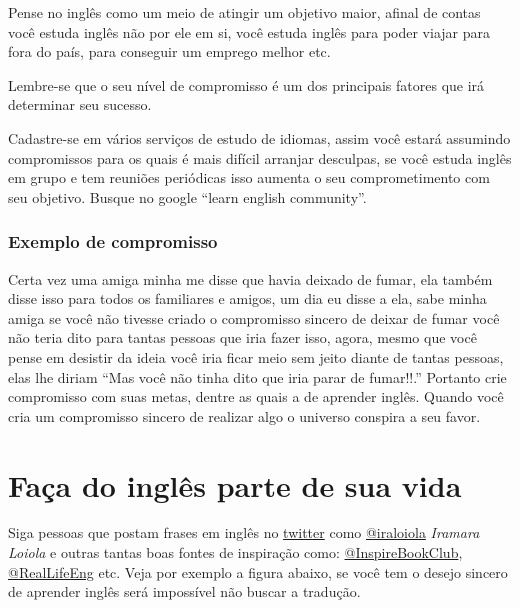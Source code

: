 \noindent
Pense no inglês como um meio de atingir um objetivo maior, afinal de
contas você estuda inglês não por ele em si, você estuda inglês para
poder viajar para fora do país, para conseguir um emprego melhor etc.


\vspace{0.3\baselineskip}
\noindent
{\footnotesize {} Lembre-se que o seu nível de compromisso é um dos principais
fatores que irá determinar seu sucesso.}

\vspace{0.3\baselineskip}
\noindent
{\footnotesize {} Cadastre-se em vários serviços de estudo de idiomas, assim você estará assumindo compromissos
para os quais é mais difícil arranjar desculpas, se você estuda inglês em grupo e tem reuniões periódicas isso
aumenta o seu comprometimento com seu objetivo. Busque no google ``learn english community''.}

\subsubsection{Exemplo de compromisso}

Certa vez uma amiga minha me disse que havia deixado de fumar, ela também
disse isso para todos os familiares e amigos, um dia eu disse a ela, sabe minha amiga
se você não tivesse criado o compromisso sincero de deixar de fumar você não teria
dito para tantas pessoas que iria fazer isso, agora, mesmo que você pense em
desistir da ideia você iria ficar meio sem jeito diante de tantas pessoas, elas
lhe diriam ``Mas você não tinha dito que iria parar de fumar!!.'' Portanto crie
compromisso com suas metas, dentre as quais a de aprender inglês. Quando você
cria um compromisso sincero de realizar algo o universo conspira a seu favor.

\section{Faça do inglês parte de sua vida}\label{sec:EnglishLife}

Siga pessoas que postam frases em inglês no \href{http://www.twitter.com}{twitter} como
 \href{http://www.twitter.com/iraloiola}{@iraloiola} \emph{Iramara Loiola} e outras tantas boas fontes
 de inspiração como: \href{http://www.twitter.com/InspireBookClub}{@InspireBookClub},
\href{http://www.twitter.com/RealLifeEng}{@RealLifeEng} etc. Veja por
exemplo a figura abaixo, se você tem o desejo sincero de aprender inglês será
impossível não buscar a tradução.

